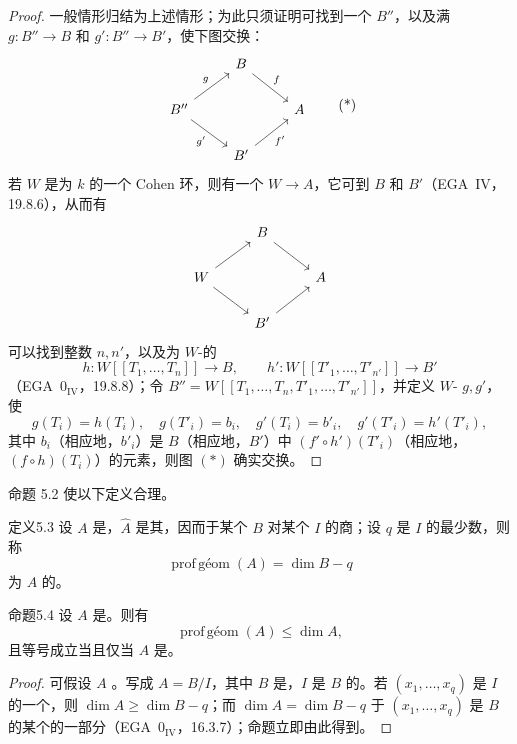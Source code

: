 \begin{proof}
一般情形归结为上述情形；为此只须证明可找到一个 $B''$，以及满 $g:B''\to B$ 和 $g':B''\to B'$，使下图交换：
\[
\begin{tikzcd}
&B\arrow[dr,"f"]&\\
B''\arrow[ur,"g"]\arrow[dr,"g'"']&&A\\
&B'\arrow[ur,"f'"']&
\end{tikzcd}\tag{*}
\]
若 $W$ 是为 $k$ 的一个 Cohen 环，则有一个 $W\to A$，它可到 $B$ 和 $B'$（EGA~IV，19.8.6），从而有
\[
\begin{tikzcd}
&B\arrow[dr]&\\
W\arrow[ur]\arrow[dr]&&A\\
&B'\arrow[ur]&
\end{tikzcd}
\]
可以找到整数 $n,n'$，以及为 $W$-的
\[
h:W[[T_1,\ldots,T_n]]\longrightarrow B,\qquad
h':W[[T'_1,\ldots,T'_{n'}]]\longrightarrow B'
\]
（EGA~$0_{\mathrm{IV}}$，19.8.8）；令 $B''=W[[T_1,\ldots,T_n,T'_1,\ldots,T'_{n'}]]$，并定义 $W$- $g,g'$，使
\[
g(T_i)=h(T_i),\quad g(T'_i)=b_i,\quad
g'(T_i)=b'_i,\quad g'(T'_i)=h'(T'_i),
\]
其中 $b_i$（相应地，$b'_i$）是 $B$（相应地，$B'$）中 $(f'\circ h')(T'_i)$（相应地，$(f\circ h)(T_i)$）的元素，则图 $(*)$ 确实交换。
\end{proof}
命题 5.2 使以下定义合理。

\begin{SGAresult}{定义}{5.3}
设 $A$ 是，$\widehat A$ 是其，因而于某个 $B$ 对某个 $I$ 的商；设 $q$ 是 $I$ 的最少数，则称
\[
\operatorname{prof\,\text{géom}}(A)=\dim B-q
\]
为 $A$ 的。
\end{SGAresult}

\begin{SGAresult}{命题}{5.4}
设 $A$ 是。则有
\[
\operatorname{prof\,\text{géom}}(A)\leq\dim A,
\]
且等号成立当且仅当 $A$ 是。
\end{SGAresult}
\begin{proof}
可假设 $A$ 。写成 $A=B/I$，其中 $B$ 是，$I$ 是 $B$ 的。若 $(x_1,\ldots,x_q)$ 是 $I$ 的一个，则 $\dim A\geq\dim B-q$；而 $\dim A=\dim B-q$ 于 $(x_1,\ldots,x_q)$ 是 $B$ 的某个的一部分（EGA~$0_{\mathrm{IV}}$，16.3.7）；命题立即由此得到。
\end{proof}

